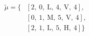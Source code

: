 \begin{equation}
\nonumber
\begin{aligned}
\tilde{\mu} = \{  & \left[\text{2}, \ \text{0}, \ \text{L}, \ \text{4}, \ \text{V}, \ \text{4}\right], \\  & \left[\text{0}, \ \text{1}, \ \text{M}, \ \text{5}, \ \text{V}, \ \text{4}\right], \\  & \left[\text{2}, \ \text{1}, \ \text{L}, \ \text{5}, \ \text{H}, \ \text{4}\right]\} \\ 
\end{aligned}
\end{equation}